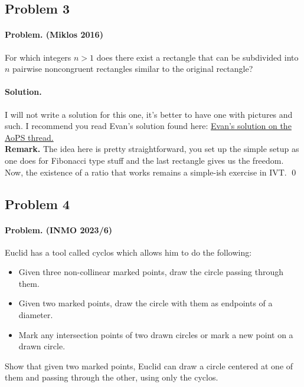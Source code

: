 \documentclass[12pt]{article}
\newenvironment{solution}
{\paragraph{Solution.}}
{\qed\eject}
\begin{document}
\subsection*{Problem 3}

\paragraph*{\textbf{Problem. (Miklos 2016)}} For which integers $n>1$ does there exist a rectangle that can be subdivided into $n$ pairwise noncongruent rectangles similar to the original rectangle?\\
\begin{solution}
    I will not write a solution for this one, it's better to have one with pictures and such. I recommend you read Evan's solution found here: \href{https://artofproblemsolving.com/community/c6h1332922p7211317}{Evan's solution on the AoPS thread.}\\

    \textbf{Remark.} The idea here is pretty straightforward, you set up the simple setup as one does for Fibonacci type stuff and the last rectangle gives us the freedom. Now, the existence of a ratio that works remains a simple-ish exercise in IVT.
\end{solution}

\subsection*{Problem 4}
\paragraph*{\textbf{Problem. (INMO 2023/6)}} 
Euclid has a tool called cyclos which allows him to do the following:
\begin{itemize}
    \item Given three non-collinear marked points, draw the circle passing through them.
    \item Given two marked points, draw the circle with them as endpoints of a diameter.
    \item Mark any intersection points of two drawn circles or mark a new point on a drawn circle.
\end{itemize}
Show that given two marked points, Euclid can draw a circle centered at one of them and passing through the other, using only the cyclos.
\end{document}
